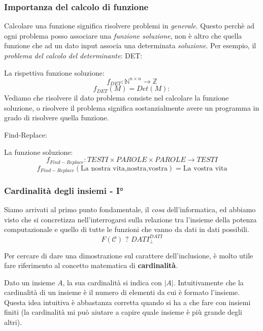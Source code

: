 \documentclass{article}
\begin{document}
\subsubsection{Importanza del calcolo di funzione}
Calcolare una funzione significa risolvere problemi in \textit{generale}. Questo
perchè ad ogni problema posso associare una \textit{funzione soluzione}, non è altro che
quella funzione che ad un dato input associa una determinata \textit{soluzione}.
Per esempio, il \textit{problema del calcolo del determinante}:
\newline
DET:
\begin{algorithm}[H]
\end{algorithm}
La rispettiva funzione soluzione:
$$f_{DET}:\mathbb{N}^{n\times n}\rightarrow \mathbb{Z}$$
$$f_{DET}(M)=Det(M):$$
Vediamo che risolvere il dato problema consiste nel calcolare la funzione soluzione,
o risolvere il problema significa sostanzialmente avere un programma in grado
di risolvere quella funzione.

Find-Replace:
\begin{algorithm}[H]
\end{algorithm}
La funzione soluzione:
$$f_{Find-Replace}:TESTI\times PAROLE\times PAROLE\rightarrow TESTI$$
$$f_{Find-Replace}(\text{La nostra vita,nostra,vostra})=\text{La vostra vita}$$

\subsubsection{Cardinalità degli insiemi - I°}
Siamo arrivati al primo punto fondamentale, il \textit{cosa} dell'informatica, ed
abbiamo visto che si concretizza nell'interrogarsi sulla relazione tra l'insieme della
potenza computazionale e quello di tutte le funzioni che vanno da dati in dati possibili.
$$F(\mathcal{C})\text{ ? }DATI_{\bot}^{DATI}$$

Per cercare di dare una dimostrazione sul carattere dell'inclusione, è molto utile
fare riferimento al concetto matematica di \textbf{cardinalità}.

Dato un insieme $A$, la sua cardinalità si indica con $|A|$. Intuitivamente che la cardinalità
di un insieme è il numero di elementi da cui è formato l'insieme. Questa idea intuitiva
è abbastanza corretta quando si ha a che fare con insiemi finiti (la cardinalità mi può
aiutare a capire quale insieme è più grande degli altri).
\end{document}

